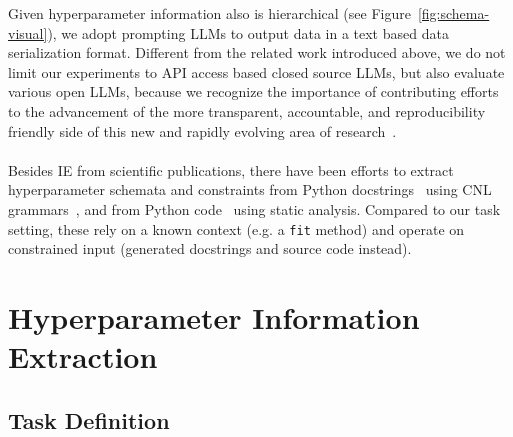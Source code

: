 Given hyperparameter information also is hierarchical (see Figure~\ref{fig:schema-visual}), we adopt prompting LLMs to output data in a text based data serialization format. Different from the related work introduced above, we do not limit our experiments to API access based closed source LLMs, but also evaluate various open LLMs, because we recognize the importance of contributing efforts to the advancement of the more transparent, accountable, and reproducibility friendly side of this new and rapidly evolving area of research~\cite{Liesenfeld2023}.\\
\\
Besides IE from scientific publications, there have been efforts to extract hyperparameter schemata and constraints from Python docstrings~\cite{Baudart2020} using CNL grammars~\cite{Kuhn2014}, and from Python code~\cite{RakAmnouykit2021} using static analysis. Compared to our task setting, these rely on a known context (e.g. a \texttt{fit} method) and operate on constrained input (generated docstrings and source code instead).

\section{Hyperparameter Information Extraction}\label{sec:hyperpie}


\subsection{Task Definition}


